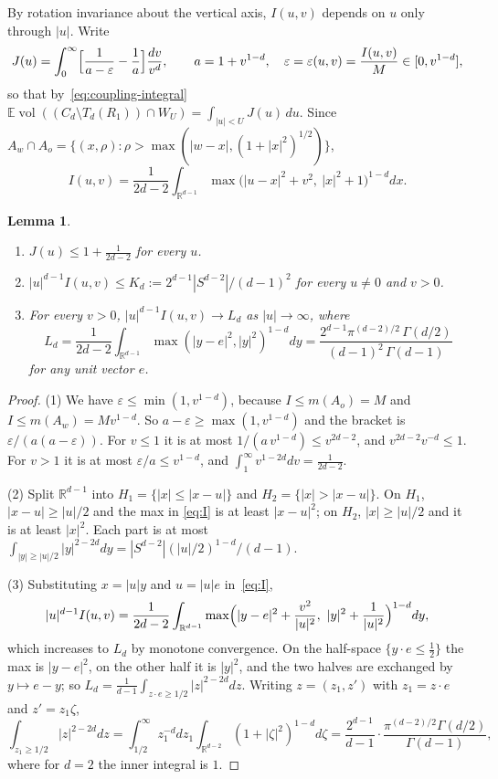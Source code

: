 \documentclass[11pt]{amsart}
\newtheorem{lemma}[theorem]{Lemma}
\theoremstyle{remark}
\newcommand{\R}{\mathbb{R}}
\newcommand{\E}{\mathbb{E}}
\newcommand{\vol}{\operatorname{vol}}
\begin{document}
By rotation invariance about the vertical axis, $I(u,v)$ depends on $u$ only through $|u|$. Write
\[
J(u)=\int_0^\infty\Bigl[\frac1{a-\varepsilon}-\frac1a\Bigr]\frac{dv}{v^d},\qquad a=1+v^{1-d},\quad
\varepsilon=\varepsilon(u,v)=\frac{I(u,v)}M\in[0,v^{1-d}],
\]
so that by~\eqref{eq:coupling-integral} $\E\vol((C_d\setminus T_d(R_1))\cap W_U)=\int_{|u|<U}J(u)\,du$. Since
$A_w\cap A_o=\{(x,\rho):\rho>\max(|w-x|,(1+|x|^2)^{1/2})\}$,
\begin{equation}\label{eq:I}
I(u,v)=\frac1{2d-2}\int_{\R^{d-1}}\max\bigl(|u-x|^2+v^2,\ |x|^2+1\bigr)^{1-d}dx .
\end{equation}

\begin{lemma}\label{lem:I}
\begin{enumerate}
\item $J(u)\le1+\frac1{2d-2}$ for every $u$.
\item $|u|^{d-1}I(u,v)\le K_d:=2^{d-1}|S^{d-2}|/(d-1)^2$ for every $u\ne0$ and $v>0$.
\item For every $v>0$, $|u|^{d-1}I(u,v)\to L_d$ as $|u|\to\infty$, where
\[
L_d=\frac1{2d-2}\int_{\R^{d-1}}\max(|y-e|^2,|y|^2)^{1-d}dy=\frac{2^{d-1}\pi^{(d-2)/2}\,\Gamma(d/2)}{(d-1)^2\,\Gamma(d-1)}
\]
for any unit vector $e$.
\end{enumerate}
\end{lemma}

\begin{proof}
(1) We have $\varepsilon\le\min(1,v^{1-d})$, because $I\le m(A_o)=M$ and $I\le m(A_w)=Mv^{1-d}$. So $a-\varepsilon\ge
\max(1,v^{1-d})$ and the bracket is $\varepsilon/(a(a-\varepsilon))$. For $v\le1$ it is at most $1/(a\,v^{1-d})\le
v^{2d-2}$, and $v^{2d-2}v^{-d}\le1$. For $v>1$ it is at most $\varepsilon/a\le v^{1-d}$, and $\int_1^\infty v^{1-2d}dv=
\frac1{2d-2}$.

(2) Split $\R^{d-1}$ into $H_1=\{|x|\le|x-u|\}$ and $H_2=\{|x|>|x-u|\}$. On $H_1$, $|x-u|\ge|u|/2$ and the max in
\eqref{eq:I} is at least $|x-u|^2$; on $H_2$, $|x|\ge|u|/2$ and it is at least $|x|^2$. Each part is at most
$\int_{|y|\ge|u|/2}|y|^{2-2d}dy=|S^{d-2}|(|u|/2)^{1-d}/(d-1)$.

(3) Substituting $x=|u|y$ and $u=|u|e$ in~\eqref{eq:I},
\[
|u|^{d-1}I(u,v)=\frac1{2d-2}\int_{\R^{d-1}}\max\Bigl(|y-e|^2+\frac{v^2}{|u|^2},\ |y|^2+\frac1{|u|^2}\Bigr)^{1-d}dy,
\]
which increases to $L_d$ by monotone convergence. On the half-space $\{y\cdot e\le\frac12\}$ the max is $|y-e|^2$,
on the other half it is $|y|^2$, and the two halves are exchanged by $y\mapsto e-y$; so $L_d=\frac1{d-1}\int_{z\cdot e
\ge1/2}|z|^{2-2d}dz$. Writing $z=(z_1,z')$ with $z_1=z\cdot e$ and $z'=z_1\zeta$,
\[
\int_{z_1\ge1/2}|z|^{2-2d}dz=\int_{1/2}^\infty z_1^{-d}dz_1\int_{\R^{d-2}}(1+|\zeta|^2)^{1-d}d\zeta
=\frac{2^{d-1}}{d-1}\cdot\frac{\pi^{(d-2)/2}\Gamma(d/2)}{\Gamma(d-1)},
\]
where for $d=2$ the inner integral is $1$.
\end{proof}
\end{document}
